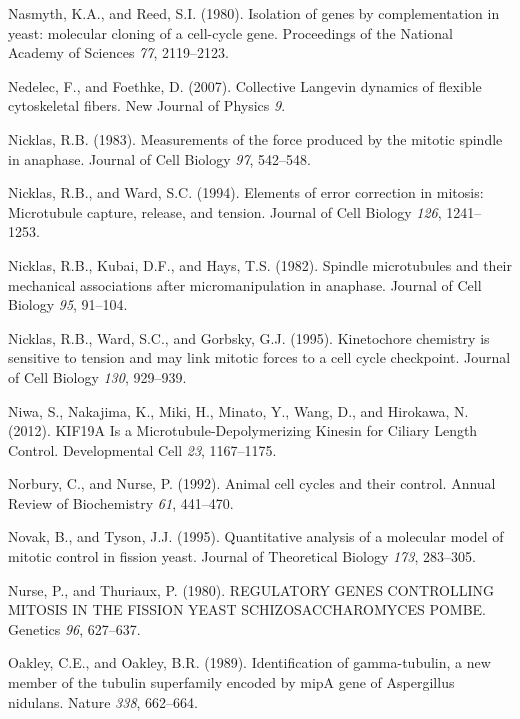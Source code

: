 \documentclass[12pt,a4paper,twoside,openright]{book}
\begin{document}
\hypertarget{ref-Nasmyth1980}{}
Nasmyth, K.A., and Reed, S.I. (1980). Isolation of genes by
complementation in yeast: molecular cloning of a cell-cycle gene.
Proceedings of the National Academy of Sciences \emph{77}, 2119--2123.

\hypertarget{ref-Nedelec2007}{}
Nedelec, F., and Foethke, D. (2007). Collective Langevin dynamics of
flexible cytoskeletal fibers. New Journal of Physics \emph{9}.

\hypertarget{ref-Nicklas1983}{}
Nicklas, R.B. (1983). Measurements of the force produced by the mitotic
spindle in anaphase. Journal of Cell Biology \emph{97}, 542--548.

\hypertarget{ref-Nicklas1994}{}
Nicklas, R.B., and Ward, S.C. (1994). Elements of error correction in
mitosis: Microtubule capture, release, and tension. Journal of Cell
Biology \emph{126}, 1241--1253.

\hypertarget{ref-Nicklas1982}{}
Nicklas, R.B., Kubai, D.F., and Hays, T.S. (1982). Spindle microtubules
and their mechanical associations after micromanipulation in anaphase.
Journal of Cell Biology \emph{95}, 91--104.

\hypertarget{ref-Nicklas1995}{}
Nicklas, R.B., Ward, S.C., and Gorbsky, G.J. (1995). Kinetochore
chemistry is sensitive to tension and may link mitotic forces to a cell
cycle checkpoint. Journal of Cell Biology \emph{130}, 929--939.

\hypertarget{ref-Niwa2012}{}
Niwa, S., Nakajima, K., Miki, H., Minato, Y., Wang, D., and Hirokawa, N.
(2012). KIF19A Is a Microtubule-Depolymerizing Kinesin for Ciliary
Length Control. Developmental Cell \emph{23}, 1167--1175.

\hypertarget{ref-Norbury1992}{}
Norbury, C., and Nurse, P. (1992). Animal cell cycles and their control.
Annual Review of Biochemistry \emph{61}, 441--470.

\hypertarget{ref-Novak1995}{}
Novak, B., and Tyson, J.J. (1995). Quantitative analysis of a molecular
model of mitotic control in fission yeast. Journal of Theoretical
Biology \emph{173}, 283--305.

\hypertarget{ref-Nurse1980}{}
Nurse, P., and Thuriaux, P. (1980). REGULATORY GENES CONTROLLING MITOSIS
IN THE FISSION YEAST SCHIZOSACCHAROMYCES POMBE. Genetics \emph{96},
627--637.

\hypertarget{ref-Oakley1989}{}
Oakley, C.E., and Oakley, B.R. (1989). Identification of gamma-tubulin,
a new member of the tubulin superfamily encoded by mipA gene of
Aspergillus nidulans. Nature \emph{338}, 662--664.
\end{document}
